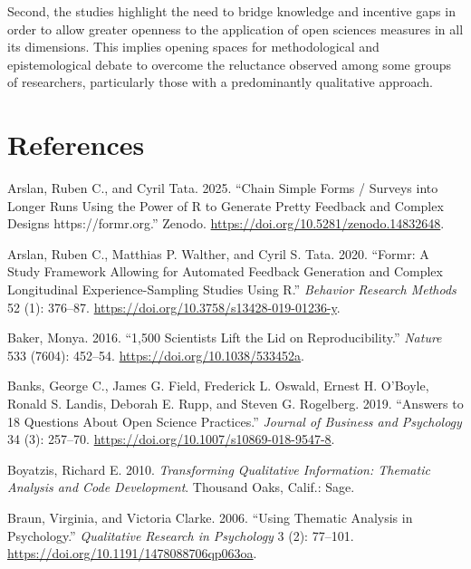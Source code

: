 \documentclass[
  letterpaper,
]{article}
\newlength{\cslhangindent}
\newenvironment{CSLReferences}[2] %
 {\begin{list}{}{%
  \setlength{\itemindent}{0pt}
  \setlength{\leftmargin}{0pt}
  \setlength{\parsep}{0pt}
  \ifodd #1
   \setlength{\leftmargin}{\cslhangindent}
   \setlength{\itemindent}{-1\cslhangindent}
  \fi
  \setlength{\itemsep}{#2\baselineskip}}}
 {\end{list}}
\begin{document}
Second, the studies highlight the need to bridge knowledge and incentive
gaps in order to allow greater openness to the application of open
sciences measures in all its dimensions. This implies opening spaces for
methodological and epistemological debate to overcome the reluctance
observed among some groups of researchers, particularly those with a
predominantly qualitative approach.

\section*{References}\label{references}

\label{refs}
\begin{CSLReferences}{1}{0}
Arslan, Ruben C., and Cyril Tata. 2025. {``Chain Simple Forms / Surveys
into Longer Runs Using the Power of {R} to Generate Pretty Feedback and
Complex Designs {https://formr.org}.''} Zenodo.
\url{https://doi.org/10.5281/zenodo.14832648}.

Arslan, Ruben C., Matthias P. Walther, and Cyril S. Tata. 2020.
{``Formr: {A} Study Framework Allowing for Automated Feedback Generation
and Complex Longitudinal Experience-Sampling Studies Using {R}.''}
\emph{Behavior Research Methods} 52 (1): 376--87.
\url{https://doi.org/10.3758/s13428-019-01236-y}.

Baker, Monya. 2016. {``1,500 Scientists Lift the Lid on
Reproducibility.''} \emph{Nature} 533 (7604): 452--54.
\url{https://doi.org/10.1038/533452a}.

Banks, George C., James G. Field, Frederick L. Oswald, Ernest H.
O'Boyle, Ronald S. Landis, Deborah E. Rupp, and Steven G. Rogelberg.
2019. {``Answers to 18 {Questions About Open Science Practices}.''}
\emph{Journal of Business and Psychology} 34 (3): 257--70.
\url{https://doi.org/10.1007/s10869-018-9547-8}.

Boyatzis, Richard E. 2010. \emph{Transforming Qualitative Information:
Thematic Analysis and Code Development}. Thousand Oaks, Calif.: Sage.

Braun, Virginia, and Victoria Clarke. 2006. {``Using Thematic Analysis
in Psychology.''} \emph{Qualitative Research in Psychology} 3 (2):
77--101. \url{https://doi.org/10.1191/1478088706qp063oa}.


\end{CSLReferences}
\end{document}
